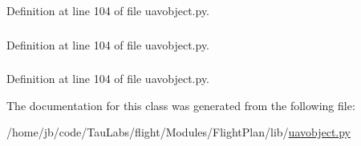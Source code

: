 \-Definition at line 104 of file uavobject.\-py.

\hypertarget{classuavobject_1_1_u_a_v_object_a00f0fd345df36ab7ff5e70d12ed90ce8}{
\subsubsection[{metadata}]{}}\label{classuavobject_1_1_u_a_v_object_a00f0fd345df36ab7ff5e70d12ed90ce8}


\-Definition at line 104 of file uavobject.\-py.

\hypertarget{classuavobject_1_1_u_a_v_object_aff7e18dd61e0464e32b141d3b123209c}{
\subsubsection[{obj\-Id}]{}}\label{classuavobject_1_1_u_a_v_object_aff7e18dd61e0464e32b141d3b123209c}


\-Definition at line 104 of file uavobject.\-py.



\-The documentation for this class was generated from the following file\-:\begin{DoxyCompactItemize}
\item 
/home/jb/code/\-Tau\-Labs/flight/\-Modules/\-Flight\-Plan/lib/\hyperlink{uavobject_8py}{uavobject.\-py}\end{DoxyCompactItemize}
